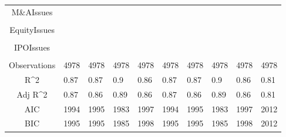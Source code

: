 \documentclass{article}
\begin{document}
\begin{table}[H]
\begin{tabular}{|clllllllll|}
  M\&AIssues &  &  &  &  &  &  &  &  &  \\ 
   &  &  &  &  &  &  &  &  &  \\ 
  EquityIssues &  &  &  &  &  &  &  &  &  \\ 
   &  &  &  &  &  &  &  &  &  \\ 
  IPOIssues &  &  &  &  &  &  &  &  &  \\ 
   &  &  &  &  &  &  &  &  &  \\ 
  \hline 
 Observations & 4978 & 4978 & 4978 & 4978 & 4978 & 4978 & 4978 & 4978 & 4978 \\ 
  R^2 & 0.87 & 0.87 & 0.9 & 0.86 & 0.87 & 0.87 & 0.9 & 0.86 & 0.81 \\ 
  Adj R^2 & 0.87 & 0.86 & 0.89 & 0.86 & 0.87 & 0.86 & 0.89 & 0.86 & 0.81 \\ 
  AIC & 1994 & 1995 & 1983 & 1997 & 1994 & 1995 & 1983 & 1997 & 2012 \\ 
  BIC & 1995 & 1995 & 1985 & 1998 & 1995 & 1995 & 1985 & 1998 & 2012 \\ 
   \hline
\end{tabular}
 
\end{table}
\end{document}
